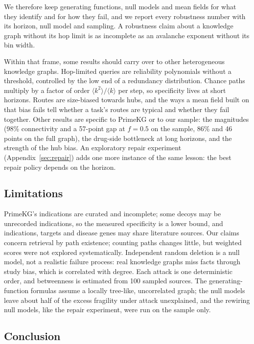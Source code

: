 We therefore keep generating functions, null models and mean fields for what
they identify and for how they fail, and we report every robustness number with
its horizon, null model and sampling. A robustness claim about a knowledge graph
without its hop limit is as incomplete as an avalanche exponent without its bin
width.

Within that frame, some results should carry over to other heterogeneous
knowledge graphs. Hop-limited queries are reliability polynomials without a
threshold, controlled by the low end of a redundancy distribution. Chance
paths multiply by a factor of order $\langle k^2\rangle/\langle k\rangle$ per
step, so specificity lives at short horizons. Routes are size-biased towards
hubs, and the ways a mean field built on that bias fails tell whether a task's
routes are typical and whether they fail together. Other results are specific to
PrimeKG or to our sample: the magnitudes (98\% connectivity and a 57-point gap
at $f=0.5$ on the sample, 86\% and 46 points on the full graph), the drug-side
bottleneck at long horizons, and the strength of the hub bias. An exploratory
repair experiment (Appendix~\ref{sec:repair}) adds one more instance of the
same lesson: the best repair policy depends on the horizon.

\subsection{Limitations}
\label{sec:discussion-limits}

PrimeKG's indications are curated and incomplete; some decoys may be unrecorded
indications, so the measured specificity is a lower bound, and indications,
targets and disease genes may share literature sources. Our claims concern
retrieval by path existence; counting paths changes little, but weighted scores
were not explored systematically. Independent random deletion is a null model,
not a realistic failure process: real knowledge graphs miss facts through study
bias, which is correlated with degree. Each attack is one deterministic order,
and betweenness is estimated from 100 sampled sources. The generating-function
formulas assume a locally tree-like, uncorrelated graph; the null models leave
about half of the excess fragility under attack unexplained, and the rewiring
null models, like the repair experiment, were run on the sample only.

\subsection{Conclusion}
\label{sec:discussion-conclusion}

